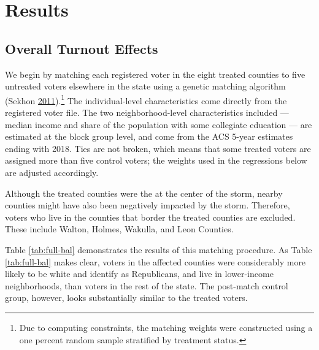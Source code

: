 \documentclass[
  12pt,
]{article}
\begin{document}
\hypertarget{results}{%
\section*{Results}\label{results}}

\hypertarget{overall-turnout-effects}{%
\subsection*{Overall Turnout Effects}\label{overall-turnout-effects}}

We begin by matching each registered voter in the eight treated counties to five untreated voters elsewhere in the state using a genetic matching algorithm (Sekhon \protect\hyperlink{ref-Sekhon2011}{2011}).\footnote{Due to computing constraints, the matching weights were constructed using a one percent random sample stratified by treatment status.} The individual-level characteristics come directly from the registered voter file. The two neighborhood-level characteristics included --- median income and share of the population with some collegiate education --- are estimated at the block group level, and come from the ACS 5-year estimates ending with 2018. Ties are not broken, which means that some treated voters are assigned more than five control voters; the weights used in the regressions below are adjusted accordingly.

Although the treated counties were the at the center of the storm, nearby counties might have also been negatively impacted by the storm. Therefore, voters who live in the counties that border the treated counties are excluded. These include Walton, Holmes, Wakulla, and Leon Counties.

Table \ref{tab:full-bal} demonstrates the results of this matching procedure. As Table \ref{tab:full-bal} makes clear, voters in the affected counties were considerably more likely to be white and identify as Republicans, and live in lower-income neighborhoods, than voters in the rest of the state. The post-match control group, however, looks substantially similar to the treated voters.
\end{document}
